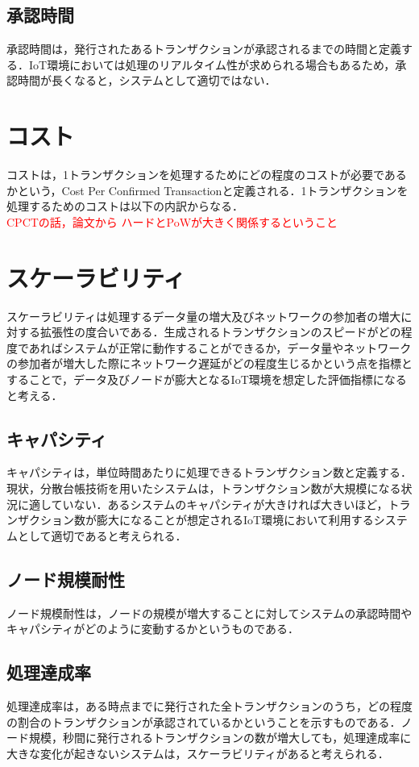 \documentclass[japanese, macos]{KU2}
\begin{document}
\subsection{承認時間}
承認時間は，発行されたあるトランザクションが承認されるまでの時間と定義する．IoT環境においては処理のリアルタイム性が求められる場合もあるため，承認時間が長くなると，システムとして適切ではない．

\section{コスト}
コストは，1トランザクションを処理するためにどの程度のコストが必要であるかという，Cost Per Confirmed Transactionと定義される．1トランザクションを処理するためのコストは以下の内訳からなる．\\
\textcolor{red}{CPCTの話，論文から ハードとPoWが大きく関係するということ}

\section{スケーラビリティ}
スケーラビリティは処理するデータ量の増大及びネットワークの参加者の増大に対する拡張性の度合いである．生成されるトランザクションのスピードがどの程度であればシステムが正常に動作することができるか，データ量やネットワークの参加者が増大した際にネットワーク遅延がどの程度生じるかという点を指標とすることで，データ及びノードが膨大となるIoT環境を想定した評価指標になると考える．
\subsection{キャパシティ}
キャパシティは，単位時間あたりに処理できるトランザクション数と定義する．現状，分散台帳技術を用いたシステムは，トランザクション数が大規模になる状況に適していない．あるシステムのキャパシティが大きければ大きいほど，トランザクション数が膨大になることが想定されるIoT環境において利用するシステムとして適切であると考えられる．
\subsection{ノード規模耐性}
ノード規模耐性は，ノードの規模が増大することに対してシステムの承認時間やキャパシティがどのように変動するかというものである．
\subsection{処理達成率}
処理達成率は，ある時点までに発行された全トランザクションのうち，どの程度の割合のトランザクションが承認されているかということを示すものである．ノード規模，秒間に発行されるトランザクションの数が増大しても，処理達成率に大きな変化が起きないシステムは，スケーラビリティがあると考えられる．
\end{document}
